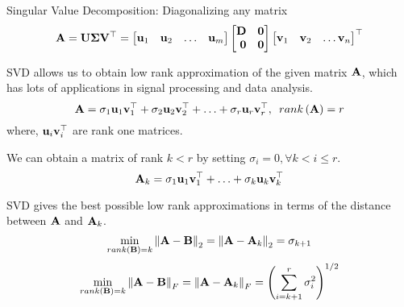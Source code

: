 \documentclass[aspectratio=169]{beamer}
\let\olditem\item
\renewcommand{\item}{\setlength{\itemsep}{\fill}\olditem}
\def\mf{\ensuremath\mathbf}
\def\lp{\ensuremath\left(}
\def\rp{\ensuremath\right)}
\def\lV{\ensuremath\left\lVert}
\def\rV{\ensuremath\right\rVert}
\def\bmx{\ensuremath\begin{bmatrix*}[r]}
\def\emx{\ensuremath\end{bmatrix*}}
\begin{document}
\begin{frame}[t]{Singular Value Decomposition: Diagonalizing any matrix}
\vspace{-0.5cm}
\[ \mf{A} = \mf{U}\mf{\Sigma}\mf{V}^\top = \bmx \mf{u}_1 & \mf{u}_2 & \ldots & \mf{u}_m\emx \bmx \mf{D} & \mf{0}\\ \mf{0} & \mf{0} \emx \bmx \mf{v}_1 & \mf{v}_2 & \ldots \mf{v}_n \emx^\top\]

SVD allows us to obtain low rank approximation of the given matrix $\mf{A}$, which has lots of applications in signal processing and data analysis.
\[ \mf{A} = \sigma_1\mf{u}_1\mf{v}_1^\top + \sigma_2\mf{u}_2\mf{v}_2^\top + \ldots + \sigma_r\mf{u}_r\mf{v}_r^\top, \,\,\, rank\lp\mf{A}\rp = r \]
where, $\mf{u}_i\mf{v}_i^\top$ are rank one matrices.

We can obtain a matrix of rank $k < r$ by setting $\sigma_i = 0, \forall k < i \leq r$.
\[ \mf{A}_{k} = \sigma_1\mf{u}_1\mf{v}_1^\top + \ldots + \sigma_{k}\mf{u}_{k}\mf{v}_{k}^\top \]

SVD gives the best possible low rank approximations in terms of the distance between $\mf{A}$ and $\mf{A}_k$.
\[ \min_{rank\lp\mf{B}\rp = k} \lV\mf{A} - \mf{B}\rV_2 = \lV\mf{A} - \mf{A}_k\rV_2 = \sigma_{k+1} \]\vspace{-0.4cm}
\[ \min_{rank\lp\mf{B}\rp = k} \lV\mf{A} - \mf{B}\rV_F = \lV\mf{A} - \mf{A}_k\rV_F = \lp\sum_{i=k+1}^{r}\sigma_{i}^2\rp^{1/2} \]
\end{frame}



\end{document}
